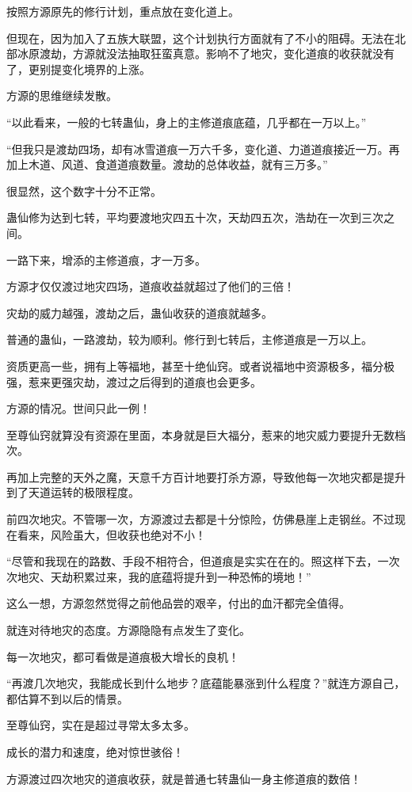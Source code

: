 \begin{this_body}
按照方源原先的修行计划，重点放在变化道上。

但现在，因为加入了五族大联盟，这个计划执行方面就有了不小的阻碍。无法在北部冰原渡劫，方源就没法抽取狂蛮真意。影响不了地灾，变化道痕的收获就没有了，更别提变化境界的上涨。

方源的思维继续发散。

“以此看来，一般的七转蛊仙，身上的主修道痕底蕴，几乎都在一万以上。”

“但我只是渡劫四场，却有冰雪道痕一万六千多，变化道、力道道痕接近一万。再加上木道、风道、食道道痕数量。渡劫的总体收益，就有三万多。”

很显然，这个数字十分不正常。

蛊仙修为达到七转，平均要渡地灾四五十次，天劫四五次，浩劫在一次到三次之间。

一路下来，增添的主修道痕，才一万多。

方源才仅仅渡过地灾四场，道痕收益就超过了他们的三倍！

灾劫的威力越强，渡劫之后，蛊仙收获的道痕就越多。

普通的蛊仙，一路渡劫，较为顺利。修行到七转后，主修道痕是一万以上。

资质更高一些，拥有上等福地，甚至十绝仙窍。或者说福地中资源极多，福分极强，惹来更强灾劫，渡过之后得到的道痕也会更多。

方源的情况。世间只此一例！

至尊仙窍就算没有资源在里面，本身就是巨大福分，惹来的地灾威力要提升无数档次。

再加上完整的天外之魔，天意千方百计地要打杀方源，导致他每一次地灾都是提升到了天道运转的极限程度。

前四次地灾。不管哪一次，方源渡过去都是十分惊险，仿佛悬崖上走钢丝。不过现在看来，风险虽大，但收获也绝对不小！

“尽管和我现在的路数、手段不相符合，但道痕是实实在在的。照这样下去，一次次地灾、天劫积累过来，我的底蕴将提升到一种恐怖的境地！”

这么一想，方源忽然觉得之前他品尝的艰辛，付出的血汗都完全值得。

就连对待地灾的态度。方源隐隐有点发生了变化。

每一次地灾，都可看做是道痕极大增长的良机！

“再渡几次地灾，我能成长到什么地步？底蕴能暴涨到什么程度？”就连方源自己，都估算不到以后的情景。

至尊仙窍，实在是超过寻常太多太多。

成长的潜力和速度，绝对惊世骇俗！

方源渡过四次地灾的道痕收获，就是普通七转蛊仙一身主修道痕的数倍！


\end{this_body}
